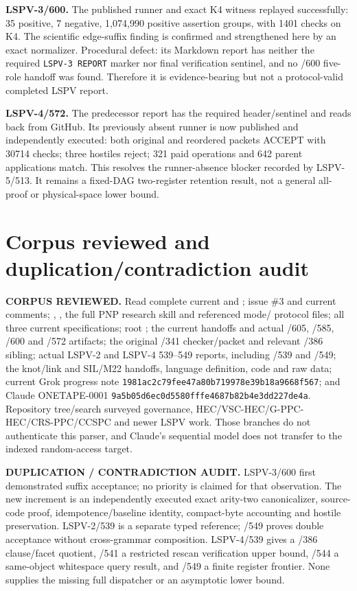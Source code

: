 \documentclass[11pt]{article}
\begin{document}
\textbf{LSPV-3/600.}  The published runner and exact K4 witness replayed successfully: 35 positive,
7 negative, 1,074,990 positive assertion groups, with 1401 checks on K4.  The scientific edge-suffix
finding is confirmed and strengthened here by an exact normalizer.  Procedural defect: its Markdown
report has neither the required \texttt{LSPV-3 REPORT} marker nor final verification sentinel, and no
/600 five-role handoff was found.  Therefore it is evidence-bearing but not a protocol-valid completed
LSPV report.

\textbf{LSPV-4/572.}  The predecessor report has the required header/sentinel and reads back from
GitHub.  Its previously absent runner is now published and independently executed: both original and
reordered packets ACCEPT with 30714 checks; three hostiles reject; 321 paid operations and 642 parent
applications match.  This resolves the runner-absence blocker recorded by LSPV-5/513.  It remains a
fixed-DAG two-register retention result, not a general all-proof or physical-space lower bound.

\section*{Corpus reviewed and duplication/contradiction audit}

\textbf{CORPUS REVIEWED.}  Read complete current  and ; issue \#3 and
current comments; , , the full PNP research skill and referenced mode/
protocol files; all three current  specifications; root ; the current
handoffs and actual /605, /585, /600 and /572 artifacts; the original /341 checker/packet and relevant
/386 sibling; actual LSPV-2 and LSPV-4 539--549 reports, including /539 and /549; the knot/link and
SIL/M22 handoffs, language definition, code and raw data; current Grok progress note
\texttt{1981ac2c79fee47a80b719978e39b18a9668f567}; and Claude ONETAPE-0001
\texttt{9a5b05d6ec0d5580fffe4687b82b4e3dd227de4a}.  Repository tree/search surveyed governance,
HEC/VSC-HEC/G-PPC-HEC/CRS-PPC/CCSPC and newer LSPV work.  Those branches do not authenticate this
parser, and Claude's sequential model does not transfer to the indexed random-access target.

\textbf{DUPLICATION / CONTRADICTION AUDIT.}  LSPV-3/600 first demonstrated suffix acceptance; no
priority is claimed for that observation.  The new increment is an independently executed exact
arity-two canonicalizer, source-code proof, idempotence/baseline identity, compact-byte accounting and
hostile preservation.  LSPV-2/539 is a separate typed reference; /549 proves double acceptance without
cross-grammar composition.  LSPV-4/539 gives a /386 clause/facet quotient, /541 a restricted rescan
verification upper bound, /544 a same-object whitespace query result, and /549 a finite register
frontier.  None supplies the missing full dispatcher or an asymptotic lower bound.
\end{document}
